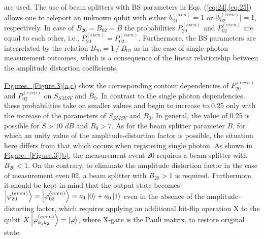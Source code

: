 \documentclass{optica-article}
\begin{document}
\!\!\!\!\!\!are used. The use of beam splitters with BS parameters in Eqs. (\ref{eq:24},\ref{eq:25}) allows one to teleport an unknown qubit with either $b_{20}^{(even)}=1$ or $\lvert b_{02}^{(even)} \rvert=1$, respectively. In case of $B_{20}=B_{02}=B$ the probabilities $P_{20}^{(even)}$ and $P_{02}^{(even)}$ are equal to each other, i.e., $P_{20}^{(even)}=P_{02}^{(even)}$. Furthermore, the BS parameters are interrelated by the relation $B_{20}=1⁄B_{02}$  as in the case of single-photon measurement outcomes, which is a consequence of the linear relationship between the amplitude distortion coefficients. 
\par\hyperref[Figure.3]{Figures.~\ref*{Figure.3}(a,c)} show the corresponding contour dependencies of $P_{20}^{(even)}$ and $P_{02}^{(even)}$ on $S_{SMSV}$ and $B_0$. In contrast to the single photon dependencies, these probabilities take on smaller values and begin to increase to 0.25 only with the increase of the parameters of $S_{SMSV}$ and $B_0$. In general, the value of 0.25 is possible for $S>10\,\,dB$ and $B_0>7$. As for the beam splitter parameter $B$, for which an unity value of the amplitude-distortion factor is possible, the situation here differs from that which occurs when registering single photon. As shown in \hyperref[Figure.3]{Figure.~\ref*{Figure.3}(b)}, the measurement event 20 requires a beam splitter with $B_{20}<1$. On the contrary, to eliminate the amplitude distortion factor in the case of measurement even 02, a beam splitter with $B_{20}>1$ is required. Furthermore, it should be kept in mind that the output state becomes $\ket{\varphi_{20}^{(even)}}=\ket{\varphi_{02}^{(even)}}=a_1 \ket{0}+a_0\ket{1}$ even in the absence of the amplitude-distorting factor, which requires applying an additional bit-flip operation X to the qubit $X\ket{\varphi_{k_1k_2}^{(even)}} = \ket{\varphi}$, where X-gate is the Pauli matrix, to restore original state.
\end{document}
